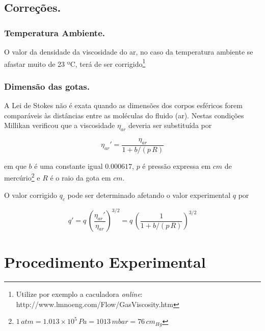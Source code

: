\documentclass[a4paper,twoside,12pt]{article}      %
\begin{document}
\subsection{\sf Correções.}
\subsubsection{\sf Temperatura Ambiente.}

O valor da densidade da viscosidade do ar, no caso da temperatura ambiente se afastar muito de 23 ºC, terá de ser corrigido\footnote{Utilize por exemplo a caculadora \emph{online}: http://www.lmnoeng.com/Flow/GasViscosity.htm}

\subsubsection{\sf Dimensão das gotas.}

A Lei de Stokes não é exata quando as dimensões dos corpos esféricos forem comparáveis às distâncias entre as moléculas do fluido (ar).
Nestas condições Millikan verificou que a viscosidade $\eta_{ar}$ deveria ser substituída por

\begin{equation}
	\label{eq:correcao}
	\eta_{ar}' = \frac{\eta_{ar}}{1 + b/(p\,R)}  
\end{equation}

em que $b$ é uma constante igual $0.000617$, $p$ é pressão expressa em $cm$ de mercúrio\footnote{$1\,atm  = 1.013 \times 10^5 \,Pa = 1013 \, mbar = 76\, cm_{Hg}$}  e $R$ é o raio da gota em $cm$.

O valor corrigido $q_c$ pode ser determinado afetando o valor experimental $q$ por

\begin{equation}
	\label{eq:correcao1}
	q ' = q\, \left(\frac{\eta_{ar}'}{\eta_{ar}}\right)^{3/2}  =q\, \left(\frac{1}{1 + b/(p\,R)}\right)^{3/2}  
\end{equation}

\newpage
\section{\sf Procedimento Experimental}
\end{document}
